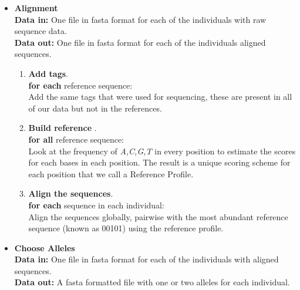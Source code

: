 \begin{itemize}
	\item \textbf{Alignment} \\
	
	\textbf{Data in:} One file in fasta format for each of the individuals with raw sequence data.\\
	\textbf{Data out:} One file in fasta format for each of the individuals aligned sequences.\\
	
	
	\begin{enumerate}
		\item \textbf{Add tags}.\\ 
		\textbf{for each} reference sequence:\\
		Add the same tags that were used for sequencing, these are present in all of our data but not in the references.
		\item \textbf{Build reference }.\\%
		\textbf{for all} reference sequence:\\
		Look at the frequency of \emph{A,C,G,T} in every position to estimate the scores for each bases in each position.
		The result is a unique scoring scheme for each position that we call a Reference Profile.
		\item \textbf{Align the sequences}.\\
		\textbf{for each} sequence in each individual:\\
		Align the sequences globally, pairwise with the most abundant reference sequence (known as 00101) using the reference profile.
	\end{enumerate}
	\item \textbf{Choose Alleles} \\ 
	
	\textbf{Data in:} One file in fasta format for each of the individuals with aligned sequences.\\
	\textbf{Data out:} A fasta formatted file with one or two alleles for each individual.\\
	

\end{itemize}
